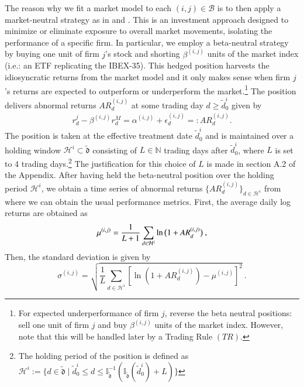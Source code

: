 \mx 
The reason why we fit a market model to each $(i,j)\in\mathcal B$ is to then apply a market-neutral strategy as in \cite{chan2003stock} and \cite{jiang2021pervasive}. This is an investment approach designed to minimize or eliminate exposure to overall market movements, isolating the performance of a specific firm. 
% 
In particular, we employ a beta-neutral strategy by buying one unit of firm $j$'s stock and shorting $\beta^{(i,j)}$ units of the market index (i.e.: an ETF replicating the IBEX-35). 
%
This hedged position harvests the idiosyncratic returns from the market model and it only makes sense when firm $j$'s returns are expected to outperform or underperform the market.\footnote{
For expected underperformance of firm $j$, reverse the beta neutral positions: 
sell one unit of firm $j$ and buy $\beta^{(i,j)}$ units of the market index. However, note that this will be handled later by a Trading Rule $(TR)$.
\mx 
}
The position delivers abnormal returns $AR^{(i,j)}_{d}$ at some trading day $d\geq \tilde{d}_0^i$ given by
\begin{align*}
r_{d}^j -  \beta^{(i,j)} r_{d}^M = \alpha^{(i,j)} + \epsilon_{d}^{(i,j)} =: AR^{(i,j)}_{d}
.
\end{align*}
The position is taken at the effective treatment date $\tilde d_0^i$ and is maintained over a holding window $\mathcal H^i \subset \tilde{\mathfrak{d}}$ consisting of $L\in\mathbb{N}$ trading days after $\tilde d_0^i$, where $L$ is set to 4 trading days.\footnote{  
The holding period of the position is defined as 
$
\mathcal H^i:=
\{
d \in \tilde{\mathfrak{d}}
\mid 
\tilde{d}_0^i
\leq d \leq 
\mathbb{I}^{-1}_{\tilde{\mathfrak{d}}}(\mathbb{I}_{\tilde{\mathfrak{d}}}(\tilde d_0^i)+L)
\}
$}
The justification for this choice of $L$ is made in section A.2 of the Appendix. 
%
%
After having held the beta-neutral position over the holding period $\mathcal H^i$, we obtain a time series of abnormal returns $\{AR_{d}^{(i,j)}\}_{d\in\mathcal H^i}$ from where we can obtain the usual performance metrics. First, the average daily log returns are obtained as
$$
\mu^{(i,j)} = \frac{1}{{{L}}+1} 
\sum_{d\in \mathcal H^i}
\ln\big{(} 1+AR_d^{(i,j)} \big{)}
~,
$$
Then, the standard deviation is given by
$$
\sigma^{(i,j)}
=
\sqrt{
\frac{1}{{{L}}}
\sum_{d\in \mathcal H^i}
[
\ln(1+AR_d^{(i,j)}) - \mu^{(i,j)}
]
^2}
~.
$$

